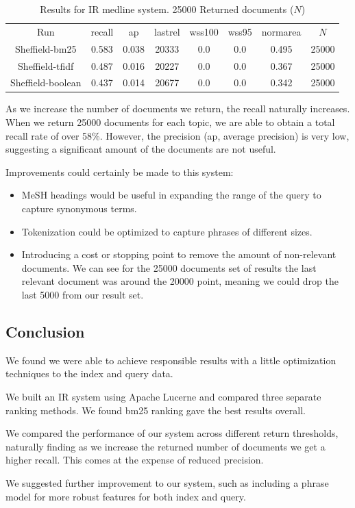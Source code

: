 \begin{table}[H]
\centering
\begin{tabular}{|c|c|c|c|c|c|c|c|} 
 \hline
 Run & recall &  ap & lastrel & wss100 & wss95 & normarea & $N$ \\ 
  Sheffield-bm25 & 0.583 &0.038 & 20333 &0.0 &0.0 & 0.495 & 25000 \\
  Sheffield-tfidf & 0.487 &0.016 & 20227 &0.0 &0.0 & 0.367 & 25000 \\
  Sheffield-boolean & 0.437 &0.014 & 20677 &0.0 &0.0 & 0.342 & 25000 \\
 \hline
\end{tabular}
\caption{Results for IR medline system. 25000 Returned documents ($N$) }
\end{table}


As we increase the number of documents we return, the recall naturally increases. When we return 25000 documents for each topic, we are able to obtain a total recall rate of over 58\%. However, the precision (ap, average precision) is very low, suggesting a significant amount of the documents are not useful.

Improvements could certainly be made to this system:

\begin{itemize}
  \item MeSH headings would be useful in expanding the range of the query to capture synonymous terms. 
  \item Tokenization could be optimized to capture phrases of different sizes.
  \item Introducing a cost or stopping point to remove the amount of non-relevant documents. We can see for the 25000 documents set of results the last relevant document was around the 20000 point, meaning we could drop the last 5000 from our result set.
\end{itemize}


\subsection{Conclusion}

We found we were able to achieve responsible results with a little optimization techniques to the index and query data.

We built an IR system using Apache Lucerne and compared three separate ranking methods. We found bm25 ranking gave the best results overall.

We compared the performance of our system across different return thresholds, naturally finding as we increase the returned number of documents we get a higher recall. This comes at the expense of reduced precision.

We suggested further improvement to our system, such as including a phrase model for more robust features for both index and query.



